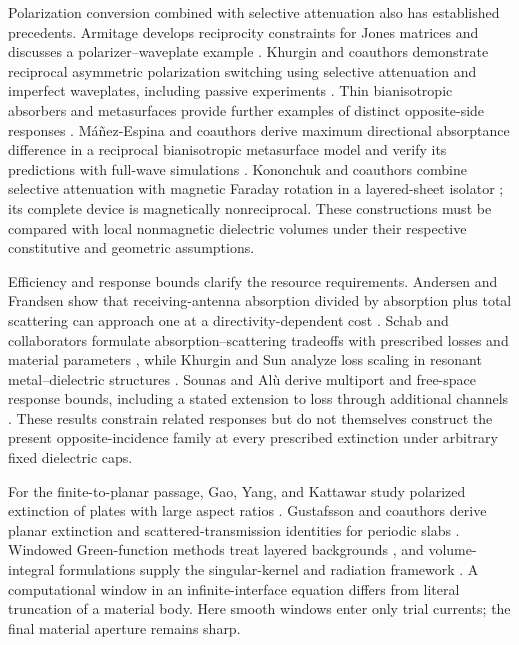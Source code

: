 \documentclass[11pt]{article}
\begin{document}
Polarization conversion combined with selective attenuation also has established precedents. Armitage develops reciprocity constraints for Jones matrices and discusses a polarizer--waveplate example \citep{Armitage2014}. Khurgin and coauthors demonstrate reciprocal asymmetric polarization switching using selective attenuation and imperfect waveplates, including passive experiments \citep{Khurgin2021}. Thin bianisotropic absorbers and metasurfaces provide further examples of distinct opposite-side responses \citep{Radi2013,Yazdi2015}. M\'a\~nez-Espina and coauthors derive maximum directional absorptance difference in a reciprocal bianisotropic metasurface model and verify its predictions with full-wave simulations \citep{ManezEspina2026}. Kononchuk and coauthors combine selective attenuation with magnetic Faraday rotation in a layered-sheet isolator \citep{Kononchuk2019}; its complete device is magnetically nonreciprocal. These constructions must be compared with local nonmagnetic dielectric volumes under their respective constitutive and geometric assumptions.

Efficiency and response bounds clarify the resource requirements. Andersen and Frandsen show that receiving-antenna absorption divided by absorption plus total scattering can approach one at a directivity-dependent cost \citep{AndersenFrandsen2005}. Schab and collaborators formulate absorption--scattering tradeoffs with prescribed losses and material parameters \citep{Schab2020}, while Khurgin and Sun analyze loss scaling in resonant metal--dielectric structures \citep{KhurginSun2011}. Sounas and Al\`u derive multiport and free-space response bounds, including a stated extension to loss through additional channels \citep{SounasAlu2017}. These results constrain related responses but do not themselves construct the present opposite-incidence family at every prescribed extinction under arbitrary fixed dielectric caps.

For the finite-to-planar passage, Gao, Yang, and Kattawar study polarized extinction of plates with large aspect ratios \citep{Gao2013}. Gustafsson and coauthors derive planar extinction and scattered-transmission identities for periodic slabs \citep{Gustafsson2012}. Windowed Green-function methods treat layered backgrounds \citep{Bruno2016,Arrieta2022}, and volume-integral formulations supply the singular-kernel and radiation framework \citep{YurkinMishchenko2018,MishchenkoYurkin2018}. A computational window in an infinite-interface equation differs from literal truncation of a material body. Here smooth windows enter only trial currents; the final material aperture remains sharp.
\end{document}
